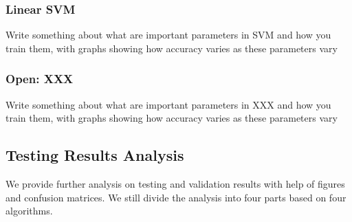 \documentclass{acm_proc_article-sp}
\begin{document}
\subsubsection{Linear SVM }
Write something about what are important parameters in SVM and how you train them, with graphs showing how accuracy varies as these parameters vary

\subsubsection{Open: XXX}
Write something about what are important parameters in XXX and how you train them, with graphs showing how accuracy varies as these parameters vary



\subsection{Testing Results Analysis}
We provide further analysis on testing and validation results with help of figures and confusion matrices. We still divide the analysis into four parts based on four algorithms.
\end{document}
